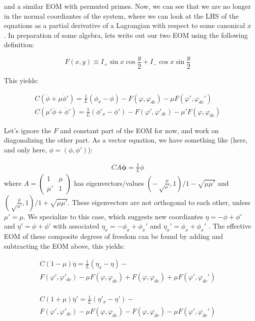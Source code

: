 \documentclass[paper=a4, twocolumn, fontsize=10pt]{article} %
\numberwithin{equation}{section} %
\numberwithin{figure}{section} %
\numberwithin{table}{section} %
\begin{document}
and a similar EOM with permuted primes. Now, we can see that we are no longer in the normal coordiantes of the system, where we can look at the LHS of the equations as a partial derivative of a Lagrangian with respect to some canonical $\dot{x}$. In preparation of some algebra, lets write out our two EOM using the following definition:

\[ F(x,y) \equiv I_{+} \sin x \cos \frac{y}{2} + I_{-} \cos x \sin \frac{y}{2} \]

This yields:

\begin{align}
    C \left( \ddot{\phi} + \mu \ddot{\phi}'\right) = \frac{1}{L} (\phi_x-\phi) - F(\varphi, \varphi_{dc}) - \mu F(\varphi',\varphi_{dc}')
    \\
    C \left( \mu' \ddot{\phi} + \ddot{\phi}'\right) = \frac{1}{L} (\phi'_x-\phi') - F(\varphi', \varphi'_{dc}) - \mu' F(\varphi,\varphi_{dc})
\end{align}

Let's ignore the $F$ and constant part of the EOM for now, and work on diagonalizing the other part. As a vector equation, we have something like (here, and only here, $\phi = (\phi, \phi')$):

\begin{align}{
    C A \ddot{\mathbf{\phi}} = \frac{1}{L} \phi 
}
\end{align}
where $A = \begin{pmatrix} 1 & \mu \\ \mu' & 1 \end{pmatrix}  $ has eigenvectors/values $(-\sqrt\frac{\mu}{\mu'}, 1)/1-\sqrt{\mu\mu'}$ and $(\sqrt\frac{\mu}{\mu'}, 1)/1+\sqrt{\mu\mu'}$. These eigenvectors are not orthogonal to each other, unless $\mu'=\mu$. We specialize to this case, which suggests new coordiantes $\eta = -\phi +\phi'$ and $\eta' = \phi+\phi'$ with associated $\eta_x = -\phi_x + \phi_x'$ and $\eta_x' = \phi_x + \phi_x'$ . The effective EOM of these composite degrees of freedom can be found by adding and subtracting the EOM above, this yields:

\begin{multline}
    C(1-\mu) \ddot{\eta} = \frac{1}{L} (\eta_x-\eta) - \\ F(\varphi', \varphi'_{dc}) - \mu F(\varphi,\varphi_{dc}) + F(\varphi, \varphi_{dc}) + \mu F(\varphi',\varphi_{dc}')
\end{multline}
    \\
\begin{multline}
    C(1+\mu) \ddot{\eta}' = \frac{1}{L} (\eta'_x-\eta') - \\ F(\varphi', \varphi'_{dc}) - \mu F(\varphi,\varphi_{dc}) - F(\varphi, \varphi_{dc}) - \mu F(\varphi',\varphi_{dc}')
\end{multline}
\end{document}
